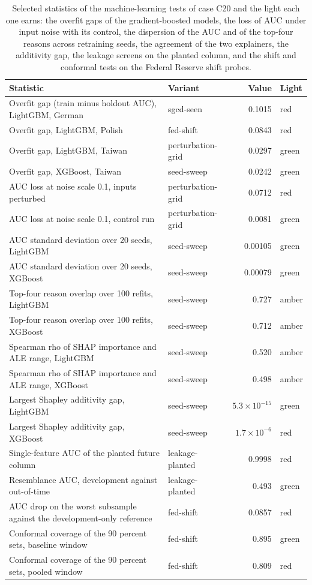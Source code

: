 \begin{table}[htbp]
\centering
\setlength{\tabcolsep}{3pt}
\footnotesize
\caption{Selected statistics of the machine-learning tests of case C20 and the light each one earns: the overfit gaps of the gradient-boosted models, the loss of AUC under input noise with its control, the dispersion of the AUC and of the top-four reasons across retraining seeds, the agreement of the two explainers, the additivity gap, the leakage screens on the planted column, and the shift and conformal tests on the Federal Reserve shift probes.}
\label{tab:vt-c20-stats}
\begin{tabular}{p{6.4cm}lrl}
\toprule
Statistic & Variant & Value & Light \\
\midrule
Overfit gap (train minus holdout AUC), LightGBM, German & sgcd-seen & 0.1015 & red \\
Overfit gap, LightGBM, Polish & fed-shift & 0.0843 & red \\
Overfit gap, LightGBM, Taiwan & perturbation-grid & 0.0297 & green \\
Overfit gap, XGBoost, Taiwan & seed-sweep & 0.0242 & green \\
AUC loss at noise scale 0.1, inputs perturbed & perturbation-grid & 0.0712 & red \\
AUC loss at noise scale 0.1, control run & perturbation-grid & 0.0081 & green \\
AUC standard deviation over 20 seeds, LightGBM & seed-sweep & 0.00105 & green \\
AUC standard deviation over 20 seeds, XGBoost & seed-sweep & 0.00079 & green \\
Top-four reason overlap over 100 refits, LightGBM & seed-sweep & 0.727 & amber \\
Top-four reason overlap over 100 refits, XGBoost & seed-sweep & 0.712 & amber \\
Spearman rho of SHAP importance and ALE range, LightGBM & seed-sweep & 0.520 & amber \\
Spearman rho of SHAP importance and ALE range, XGBoost & seed-sweep & 0.498 & amber \\
Largest Shapley additivity gap, LightGBM & seed-sweep & $5.3\times10^{-15}$ & green \\
Largest Shapley additivity gap, XGBoost & seed-sweep & $1.7\times10^{-6}$ & red \\
Single-feature AUC of the planted future column & leakage-planted & 0.9998 & red \\
Resemblance AUC, development against out-of-time & leakage-planted & 0.493 & green \\
AUC drop on the worst subsample against the development-only reference & fed-shift & 0.0857 & red \\
Conformal coverage of the 90 percent sets, baseline window & fed-shift & 0.895 & green \\
Conformal coverage of the 90 percent sets, pooled window & fed-shift & 0.809 & red \\
\bottomrule
\end{tabular}
\end{table}
